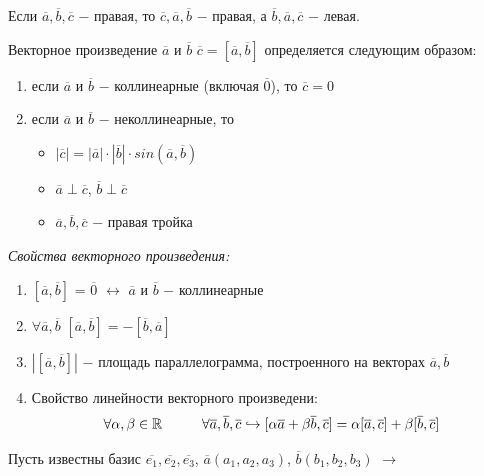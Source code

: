 Если $\overline{a}, \overline{b}, \overline{c}$ $-$ правая, то $\overline{c}, \overline{a}, \overline{b}$ $-$ правая, а $\overline{b}, \overline{a}, \overline{c}$ $-$ левая.

\begin{definition}
    $\textit{Векторное произведение}$ $\overline{a}$ и $\overline{b}$  $\overline{c} = [\overline{a}, \overline{b}]$ определяется следующим образом:
    \begin{enumerate}
        \item если $\overline{a}$ и $\overline{b}$ $-$ коллинеарные (включая $\overline{0}$), то $\overline{c} = 0$
        \item если $\overline{a}$ и $\overline{b}$ $-$ неколлинеарные, то 
        \begin{itemize}
            \item $|\overline{c}| = |\overline{a}|\cdot|\overline{b}|\cdot sin(\overline{a}, \overline{b})$
            \item $\overline{a}\perp\overline{c}$, $\overline{b}\perp\overline{c}$
            \item $\overline{a}, \overline{b}, \overline{c}$ $-$ правая тройка
        \end{itemize}
    \end{enumerate}
\end{definition}

\textit{Свойства векторного произведения:}

\begin{enumerate}
    \item $[\overline{a}, \overline{b}]$ = $\overline{0}$ $\longleftrightarrow$ $\overline{a}$ и $\overline{b}$ $-$ коллинеарные
    \item $\forall\overline{a}, \overline{b}$ $[\overline{a}, \overline{b}] = - [\overline{b}, \overline{a}]$
    \item $|[\overline{a}, \overline{b}]|$ $-$ площадь параллелограмма, построенного на векторах $\overline{a}, \overline{b}$
    \item Свойство линейности векторного произведени:
    \[
    \forall\alpha, \beta \in \mathbb{R}\hspace*{1cm}\forall\overline{a}, \overline{b}, \overline{c}\hookrightarrow[\alpha\overline{a} + \beta\overline{b}, \overline{c}] = \alpha[\overline{a}, \overline{c}] + \beta[\overline{b}, \overline{c}]
    \]
\end{enumerate}

Пусть известны базис $\overline{e_1}, \overline{e_2}, \overline{e_3}$, $\overline{a}(a_1, a_2, a_3)$, $\overline{b}(b_1, b_2, b_3)$ $\longrightarrow$ 

